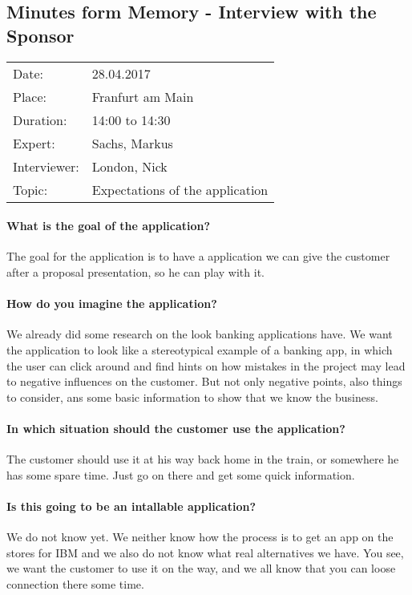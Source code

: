 \subsection*{Minutes form Memory  - Interview with the Sponsor}
\begin{tabular}{l l}
Date: & 28.04.2017 \\
Place: & Franfurt am Main \\
Duration: & 14:00 to 14:30 \\
Expert: & Sachs, Markus \\
Interviewer: & London, Nick \\
Topic: & Expectations of the application
\end{tabular}

\paragraph{What is the goal of the application?} The goal for the application is to have a application we can give the customer after a proposal presentation, so he can play with it. 

\paragraph{How do you imagine the application?} We already did some research on the look banking applications have. We want the application to  look like a stereotypical example of a banking app, in which the user can click around and find hints on how mistakes in the project may lead to negative influences on the customer. But not only negative points, also things to consider, ans some basic information to show that we know the business.

\paragraph{In which situation should the customer use the application?} The customer should use it at his way back home in the train, or somewhere he has some spare time. Just go on there and get some quick information. 

\paragraph{Is this going to be an intallable application?} We do not know yet. We neither know how the process is to get an app on the stores for IBM and we also do not know what real alternatives we have. You see, we want the customer to use it on the way, and we all know that you can loose connection there some time.

